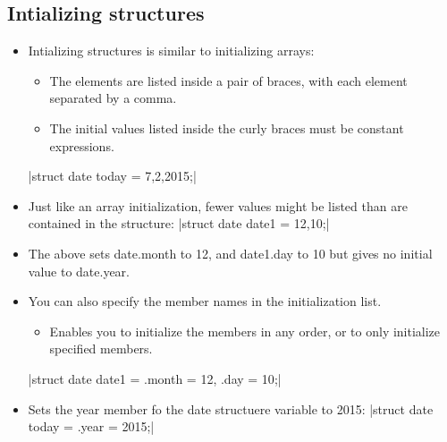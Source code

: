 \subsection{Intializing structures}
\begin{itemize}
    \item Intializing structures is similar to initializing arrays:
        \begin{itemize}
            \item The elements are listed inside a pair of braces, with each element separated by a comma. 
            \item The initial values listed inside the curly braces must be constant expressions. 
        \end{itemize}
        |struct date today = {7,2,2015};|
    
    \item Just like an array initialization, fewer values might be listed than are contained in the structure:
        |struct date date1 = {12,10};|
    
    \item The above sets date.month to 12, and date1.day to 10 but gives no initial value to date.year.

    \item You can also specify the member names in the initialization list.
        \begin{itemize}
            \item Enables you to initialize the members in any order, or to only initialize specified members.
        \end{itemize}
        |struct date date1 = {.month = 12, .day = 10};|
    
    \item Sets the year member fo the date structuere variable to 2015:
        |struct date today = {.year = 2015};|
\end{itemize}

